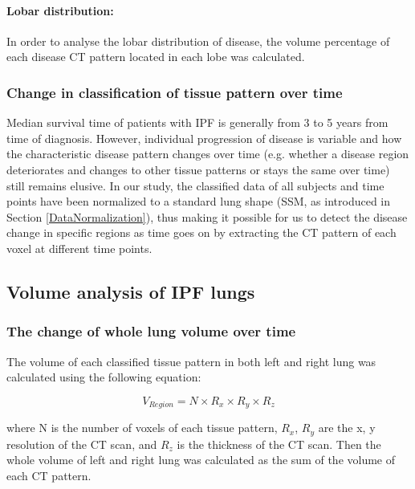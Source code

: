 \paragraph{Lobar distribution:} In order to analyse the lobar distribution of disease, the volume percentage of each disease CT pattern located in each lobe was calculated.

\subsubsection{Change in classification of tissue pattern over time}
Median survival time of patients with IPF is generally from 3 to 5 years from time of diagnosis. However, individual progression of disease is variable and how the characteristic disease pattern changes over time (e.g. whether a disease region deteriorates and changes to other tissue patterns or stays the same over time) still remains elusive. In our study, the classified data of all subjects and time points have been normalized to a standard lung shape (SSM, as introduced in Section \ref{DataNormalization}), thus making it possible for us to detect the disease change in specific regions as time goes on by extracting the CT pattern of each voxel at different time points.

\subsection{Volume analysis of IPF lungs} \label{VolumeAnalysis}
\subsubsection{The change of whole lung volume over time}
The volume of each classified tissue pattern in both left and right lung was calculated using the following equation:

\begin{equation}
V_{Region} = N \times R_x \times R_y \times R_z
\end{equation}

\noindent where N is the number of voxels of each tissue pattern, $R_{x}$, $R_{y}$ are the x, y resolution of the CT scan, and $R_{z}$ is the thickness of the CT scan. Then the whole volume of left and right lung was calculated as the sum of the volume of each CT pattern.


